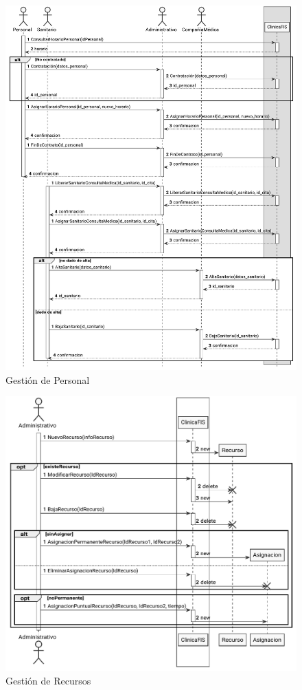 \documentclass[11pt,a4paper]{article}
\begin{document}
\begin{figure}[H]
	\caption{Gestión de Personal}
	\centering
	\includegraphics{diagramas/pdf/diagramaPersonal.pdf}
\end{figure}

\begin{figure}[H]
	\caption{Gestión de Recursos}
	\centering
	\includegraphics{diagramas/pdf/diagramaRecursos.pdf}
\end{figure}
\end{document}
